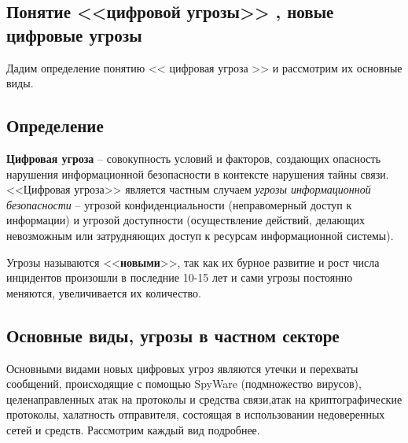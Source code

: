 \parindent=1cm %
\begin{center}
	
	\section{Понятие <<цифровой угрозы>> , новые цифровые угрозы}
	
\end{center}

Дадим определение понятию << цифровая угроза >> и рассмотрим их основные виды.
\subsection{Определение}


	\textbf{Цифровая угроза} -- совокупность условий и факторов, создающих опасность нарушения информационной безопасности  в контексте нарушения тайны связи.%
<<Цифровая угроза>> является частным случаем \textit{угрозы информационной безопасности} -- угрозой конфиденциальности (неправомерный доступ к информации) и угрозой доступности (осуществление действий, делающих невозможным или затрудняющих доступ к ресурсам информационной системы). 

Угрозы называются <<\textbf{новыми}>>, так как их бурное развитие и рост числа инцидентов произошли в последние 10-15 лет и сами угрозы постоянно меняются, увеличивается их количество.  

\subsection{Основные виды, угрозы в частном секторе}

	Основными видами новых цифровых  угроз являются  утечки и перехваты сообщений, происходящие с помощью  SpyWare (подмножество вирусов),  целенаправленных атак  на протоколы и средства связи,атак на криптографические протоколы, халатность отправителя, состоящая в использовании недоверенных  сетей и средств. Рассмотрим каждый вид  подробнее.
	

